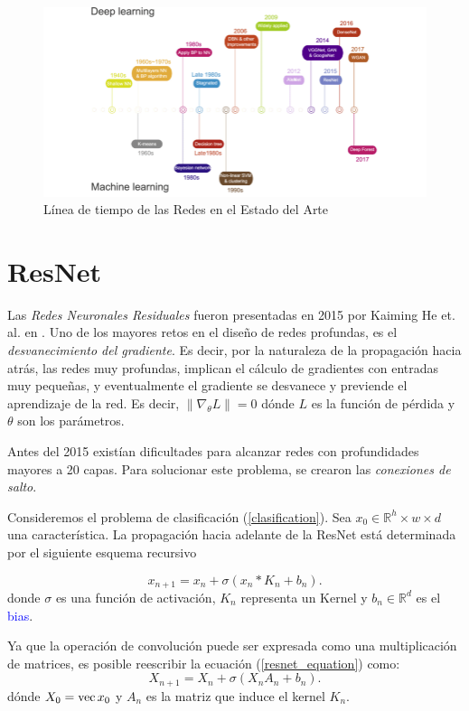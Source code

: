 \begin{figure}[H]
    \centering
    \includegraphics[width=5in]{../cap2_CNNs/src/timeline.png}
    \caption{Línea de tiempo de las Redes en el Estado del Arte} 
\end{figure}
\section{ResNet}
\label{resnet_section}
Las \textsl{Redes Neuronales Residuales} fueron presentadas en 2015 por Kaiming He et. al. en \cite{resnet0}. Uno de los mayores retos en el diseño de redes profundas, es el \textsl{desvanecimiento del gradiente}. Es decir, por la naturaleza de la propagación hacia atrás, las redes muy profundas, implican el cálculo de gradientes con entradas muy pequeñas, y eventualmente el gradiente se desvanece y previende el aprendizaje de la red.
Es decir, $\|\nabla_\theta L\| = 0$ dónde $L$ es la función de pérdida y $\theta$ son los parámetros. 

Antes del 2015 existían dificultades para alcanzar redes con profundidades mayores a 20 capas. Para solucionar este problema, se crearon las \textsl{conexiones de salto}.

\begin{definition} 
    Consideremos el problema de clasificación (\ref{clasification}). Sea $x_0\in \mathbb R^h\times w\times d$ una característica. La propagación hacia adelante de la ResNet está determinada por el siguiente esquema recursivo 

    \begin{equation}
        \label{resnet_equation}
        x_{n+1} = x_n + \sigma(x_n * K_n + b_n).
    \end{equation}
    donde $\sigma$ es una función de activación, $K_n$ representa un Kernel y $b_n\in \mathbb R^d$ es el \textcolor{blue}{bias}.
\end{definition}
Ya que la operación de convolución puede ser expresada como una multiplicación de matrices, es posible reescribir la ecuación (\ref{resnet_equation}) como:
\begin{equation}
    \label{resnet_equation_modified}
    X_{n+1} = X_n + \sigma(X_nA_n + b_n).
\end{equation}
dónde $X_0 = \operatorname{vec}{x_0}$ y $A_n$ es la matriz que induce el kernel $K_n$. 

